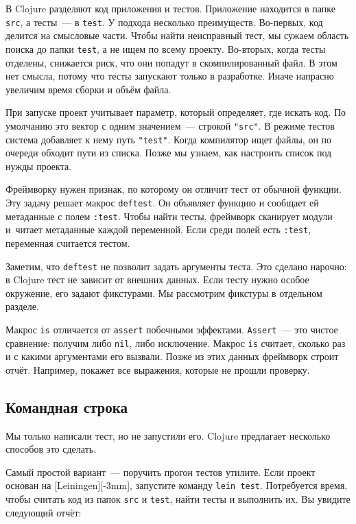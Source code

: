 В Clojure разделяют код приложения и тестов. Приложение находится в папке
\verb|src|, а тесты~--- в \verb|test|. У подхода несколько
преимуществ. Во-первых, код делится на смысловые части. Чтобы найти неисправный
тест, мы сужаем область поиска до папки \verb|test|, а не ищем по всему
проекту. Во-вторых, когда тесты отделены, снижается риск, что они попадут в
скомпилированный файл. В этом нет смысла, потому что тесты запускают только в
разработке. Иначе напрасно увеличим время сборки и объём файла.

При запуске проект учитывает параметр, который определяет, где искать код. По
умолчанию это вектор с одним значением~--- строкой \verb|"src"|. В режиме тестов
система добавляет к нему путь \verb|"test"|. Когда компилятор ищет файлы, он по
очереди обходит пути из списка. Позже мы узнаем, как настроить список под нужды
проекта.


Фреймворку нужен признак, по которому он отличит тест от обычной функции. Эту
задачу решает макрос \verb|deftest|. Он объявляет функцию и сообщает ей
метаданные с полем \verb|:test|. Чтобы найти тесты, фреймворк сканирует модули
и~читает метаданные каждой переменной. Если среди полей есть \verb|:test|,
переменная считается тестом.

Заметим, что \verb|deftest| не позволит задать аргументы теста. Это сделано
нарочно: в Clojure тест не зависит от внешних данных. Если тесту нужно особое
окружение, его задают фикстурами. Мы рассмотрим фикстуры в отдельном разделе.

Макрос \verb|is| отличается от \verb|assert| побочными
эффектами. \verb|Assert|~--- это чистое сравнение: получим либо \verb|nil|, либо
исключение. Макрос \verb|is| считает, сколько раз и с какими аргументами его
вызвали. Позже из этих данных фреймворк строит отчёт. Например, покажет все
выражения, которые не прошли проверку.

\subsection{Командная строка}

Мы только написали тест, но не запустили его. Clojure предлагает несколько
способов это сделать.


Самый простой вариант~--- поручить прогон тестов утилите. Если проект основан на
[Leiningen][-3mm], запустите команду \verb|lein test|.
Потребуется время, чтобы считать код из папок \verb|src| и \verb|test|,
найти тесты и выполнить их. Вы увидите следующий отчёт:

